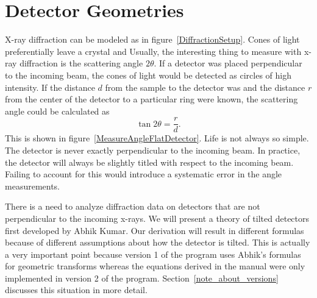\chapter{Detector Geometries}\label{theory_chapter}

X-ray diffraction can be modeled as in figure~\ref{DiffractionSetup}. 
Cones of light preferentially leave a crystal and Usually, the 
interesting thing to measure with x-ray 
diffraction is the scattering angle 
$2\theta$. If a detector was placed perpendicular 
to the incoming beam, the cones of light would be detected as 
circles of high intensity. 
If the distance $d$ 
from the sample to the detector was and 
the distance $r$ from the center of the detector to a 
particular ring were known, the scattering angle could
be calculated as
\begin{equation}
    \tan2\theta = \frac{r}{d}.
\end{equation}
This is shown in figure~\ref{MeasureAngleFlatDetector}. 
Life is not always so simple. The detector is never
exactly perpendicular to the incoming beam.  In practice, 
the detector will always be slightly titled with respect 
to the incoming beam. Failing to account for this would
introduce a systematic error in the angle measurements.

\begin{SCfigure}[1][bthp]
    \centering
    
    \caption{An X-Ray diffraction setup. X-rays scatter from a 
    sample and are captured by a detector.}
    \label{DiffractionSetup}
\end{SCfigure}

\begin{SCfigure}[1][bthp]
    \centering
    
    \caption{The same setup as in figure~\ref{DiffractionSetup}. 
    $2\theta$ is the scattering angle of the light,
    $d$ is the distance 
    from the crystal to the detector, and $r$ is the distance 
    from the center of the detector.}
    \label{MeasureAngleFlatDetector}
\end{SCfigure}

There is a need to analyze diffraction data on detectors that are 
not perpendicular to the incoming x-rays. We will present a 
theory of tilted detectors first developed by Abhik Kumar\cite{Kumar05}.
 Our derivation will result in 
different formulas because of different assumptions
about how the detector is tilted. This is actually a very important
point because version 1 of the program uses Abhik's formulas for
geometric transforms whereas the equations derived in the manual
were only implemented in version 2 of the program.
Section~\ref{note_about_versions} discusses this situation in
more detail.

